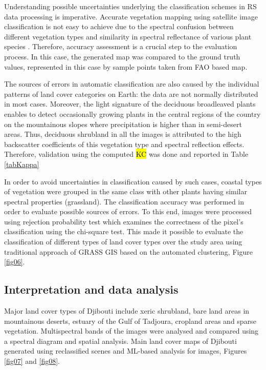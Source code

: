 \documentclass[jimaging,article,submit,pdftex,moreauthors]{Definitions/mdpi}
\begin{document}
{Understanding possible uncertainties underlying the classification schemes in RS data processing is imperative. }Accurate vegetation mapping using satellite image classification is not easy to achieve due to the spectral confusion between different vegetation types and{ }similarity in spectral reflectance of various plant species \cite{1370179,Dobrowski,Moore,8688643}. {Therefore, accuracy assessment is a crucial step to the evaluation process. In this case, the generated map was compared to the ground truth values, represented in this case by sample points taken from FAO based map}. 

{The sources of errors in automatic classification are also caused by the individual patterns of land cover categories on Earth: the }data are not normally distributed in most cases. {Moreover, }the light signature of the deciduous broadleaved plants enables to detect occasionally growing plants in the central regions of the country on the mountainous slopes where precipitation is higher than in semi-desert areas. {Thus}, deciduous shrubland in all the images is attributed to the high backscatter coefficients of this vegetation type and spectral reflection effects. Therefore, validation using the computed \hl{KC} was done and reported in Table \ref{tabKappa}

{In order to avoid uncertainties in classification caused by such cases,} coastal types of vegetation {were} grouped in the same class with other plants having similar spectral properties (grassland). {The} classification accuracy {was performed in order to evaluate possible sources of errors. To this end, images} were processed using rejection probability test which examines the correctness of the pixel’s classification using {the} chi-square test. This made it possible to evaluate the classification of different types of land {cover types over the} study area using traditional{ }approach of GRASS GIS based on {the }automated clustering, Figure \ref{fig06}. 

\subsection{Interpretation and data analysis}

Major land cover types of Djibouti {include} xeric shrubland, bare land areas in mountainous deserts, estuary of the Gulf of Tadjoura, cropland areas and sparse vegetation{. Multispectral} bands of the images were analysed and compared using a spectral diagram and spatial analysis. Main land cover maps of Djibouti generated using{ reclassified scenes} and ML-based {analysis} for images{, }Figures \ref{fig07} and \ref{fig08}.
\end{document}
